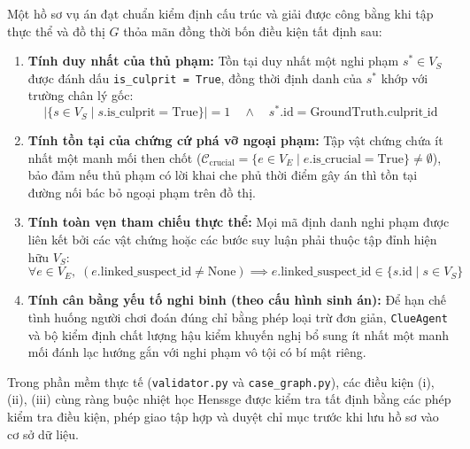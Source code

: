 \begin{invariant}
Một hồ sơ vụ án đạt chuẩn kiểm định cấu trúc và giải được công bằng khi tập thực thể và đồ thị $G$ thỏa mãn đồng thời bốn điều kiện tất định sau:
\begin{enumerate}[label=(\roman*)]
    \item \textbf{Tính duy nhất của thủ phạm:} Tồn tại duy nhất một nghi phạm $s^* \in V_S$ được đánh dấu \texttt{is\_culprit = True}, đồng thời định danh của $s^*$ khớp với trường chân lý gốc:
    \begin{equation}
        |\{s \in V_S \mid s.\text{is\_culprit} = \text{True}\}| = 1 \quad \land \quad s^*.\text{id} = \text{GroundTruth.culprit\_id}
    \end{equation}
    
    \item \textbf{Tính tồn tại của chứng cứ phá vỡ ngoại phạm:} Tập vật chứng chứa ít nhất một manh mối then chốt ($\mathcal{C}_{\text{crucial}} = \{e \in V_E \mid e.\text{is\_crucial} = \text{True}\} \neq \emptyset$), bảo đảm nếu thủ phạm có lời khai che phủ thời điểm gây án thì tồn tại đường nối bác bỏ ngoại phạm trên đồ thị.
    
    \item \textbf{Tính toàn vẹn tham chiếu thực thể:} Mọi mã định danh nghi phạm được liên kết bởi các vật chứng hoặc các bước suy luận phải thuộc tập đỉnh hiện hữu $V_S$:
    \begin{equation}
        \forall e \in V_E, \; (e.\text{linked\_suspect\_id} \neq \text{None}) \implies e.\text{linked\_suspect\_id} \in \{s.\text{id} \mid s \in V_S\}
    \end{equation}
    
    \item \textbf{Tính cân bằng yếu tố nghi binh (theo cấu hình sinh án):} Để hạn chế tình huống người chơi đoán đúng chỉ bằng phép loại trừ đơn giản, \texttt{ClueAgent} và bộ kiểm định chất lượng hậu kiểm khuyến nghị bổ sung ít nhất một manh mối đánh lạc hướng gắn với nghi phạm vô tội có bí mật riêng.
\end{enumerate}
\end{invariant}

Trong phần mềm thực tế (\texttt{validator.py} và \texttt{case\_graph.py}), các điều kiện (i), (ii), (iii) cùng ràng buộc nhiệt học Henssge được kiểm tra tất định bằng các phép kiểm tra điều kiện, phép giao tập hợp và duyệt chỉ mục trước khi lưu hồ sơ vào cơ sở dữ liệu.

